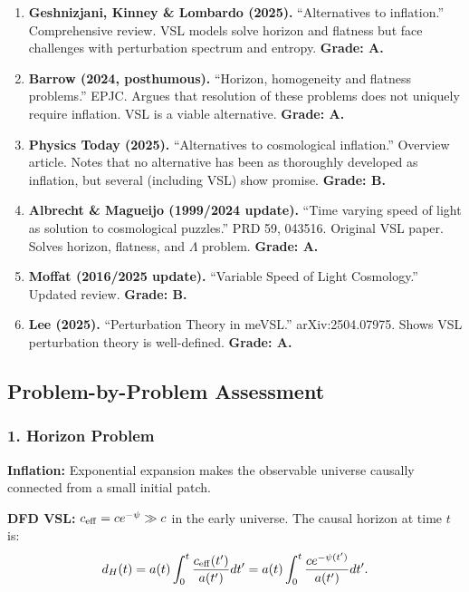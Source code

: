 \documentclass[11pt,a4paper]{article}
\begin{document}
\begin{enumerate}
\item \textbf{Geshnizjani, Kinney \& Lombardo (2025).} ``Alternatives to inflation.'' Comprehensive review. VSL models solve horizon and flatness but face challenges with perturbation spectrum and entropy. \textbf{Grade: A.}

\item \textbf{Barrow (2024, posthumous).} ``Horizon, homogeneity and flatness problems.'' EPJC. Argues that resolution of these problems does not uniquely require inflation. VSL is a viable alternative. \textbf{Grade: A.}

\item \textbf{Physics Today (2025).} ``Alternatives to cosmological inflation.'' Overview article. Notes that no alternative has been as thoroughly developed as inflation, but several (including VSL) show promise. \textbf{Grade: B.}

\item \textbf{Albrecht \& Magueijo (1999/2024 update).} ``Time varying speed of light as solution to cosmological puzzles.'' PRD 59, 043516. Original VSL paper. Solves horizon, flatness, and $\Lambda$ problem. \textbf{Grade: A.}

\item \textbf{Moffat (2016/2025 update).} ``Variable Speed of Light Cosmology.'' Updated review. \textbf{Grade: B.}

\item \textbf{Lee (2025).} ``Perturbation Theory in meVSL.'' arXiv:2504.07975. Shows VSL perturbation theory is well-defined. \textbf{Grade: A.}
\end{enumerate}

\subsection{Problem-by-Problem Assessment}

\subsubsection{1. Horizon Problem}

\textbf{Inflation:} Exponential expansion makes the observable universe causally connected from a small initial patch.

\textbf{DFD VSL:} $c_{\rm eff} = ce^{-\psi} \gg c$ in the early universe. The causal horizon at time $t$ is:
\begin{equation}
d_H(t) = a(t)\int_0^t \frac{c_{\rm eff}(t')}{a(t')}dt' = a(t)\int_0^t \frac{ce^{-\psi(t')}}{a(t')}dt'.
\end{equation}
\end{document}
